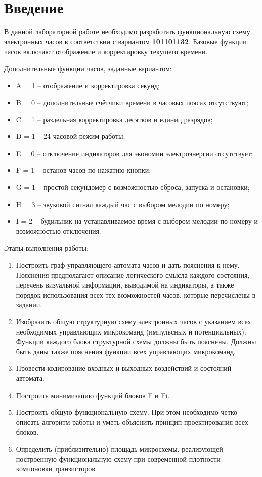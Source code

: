 \section*{Введение}

В данной лабораторной работе необходимо разработать функциональную схему электронных часов в соответствии с вариантом \textbf{101101132}. Базовые функции часов включают отображение и корректировку текущего времени.

Дополнительные функции часов, заданные вариантом:
\begin{itemize}
    \item A = 1 -- отображение и корректировка секунд;
    \item B = 0 -- дополнительные счётчики времени в часовых поясах отсутствуют;
    \item C = 1 -- раздельная корректировка десятков и единиц разрядов;
    \item D = 1 -- 24-часовой режим работы;
    \item E = 0 -- отключение индикаторов для экономии электроэнергии отсутствует;
    \item F = 1 -- останов часов по нажатию кнопки;
    \item G = 1 -- простой секундомер с возможностью сброса, запуска и остановки;
    \item H = 3 -- звуковой сигнал каждый час с выбором мелодии по номеру;
    \item I = 2 -- будильник на устанавливаемое время с выбором мелодии по номеру и возможностью отключения.
\end{itemize}

Этапы выполнения работы:

\begin{enumerate}
\item Построить граф управляющего автомата часов и дать пояснения к нему. Пояснения предполагают
описание логического смысла каждого состояния, перечень визуальной информации, выводимой на
индикаторы, а также порядок использования всех тех возможностей часов, которые перечислены в задании.
\item Изобразить общую структурную схему электронных часов с указанием всех необходимых управляющих
микрокоманд (импульсных и потенциальных). Функции каждого блока структурной схемы должны быть
пояснены. Должны быть даны также пояснения функции всех управляющих микрокоманд.
\item Провести кодирование входных и выходных воздействий и состояний автомата.
\item Построить минимизацию функций блоков F и Fi.
\item Построить общую функциональную схему. При этом необходимо четко описать алгоритм работы и уметь
объяснить принцип проектирования всех блоков.
\item Определить (приблизительно) площадь микросхемы, реализующей построенную функциональную схему
при современной плотности компоновки транзисторов
\end{enumerate}
